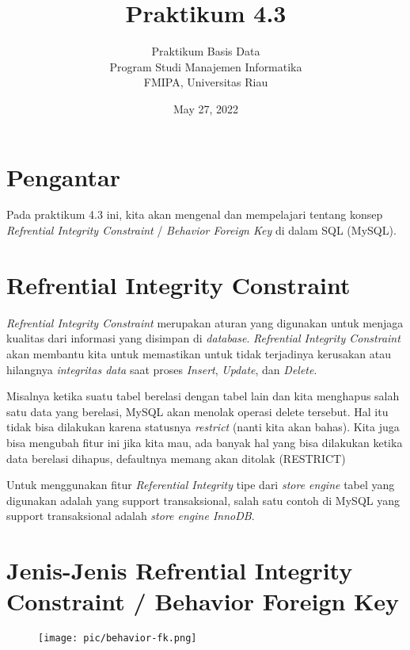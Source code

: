 \documentclass[a4paper]{article}
\title{Praktikum 4.3}
\author{Praktikum Basis Data\\ Program Studi Manajemen Informatika \\ FMIPA, Universitas Riau }
\date{May 27, 2022}
\begin{document}
\maketitle

\section{Pengantar}%
\label{sec:pengantar}

Pada praktikum 4.3 ini, kita akan mengenal dan mempelajari tentang konsep \textit{Refrential Integrity Constraint} /  \textit{Behavior Foreign Key} di dalam SQL (MySQL).

\section{Refrential Integrity Constraint}%
\label{sec:section_name}

\textit{Refrential Integrity Constraint} merupakan aturan yang digunakan untuk menjaga kualitas dari informasi yang disimpan di \textit{database}. \textit{Refrential  Integrity Constraint} akan membantu kita untuk memastikan untuk tidak terjadinya kerusakan atau hilangnya \textit{integritas data} saat proses \textit{Insert}, \textit{Update}, dan \textit{Delete}.

Misalnya ketika suatu tabel berelasi dengan tabel lain dan kita menghapus salah satu data yang berelasi, MySQL akan menolak operasi delete tersebut. Hal itu tidak bisa dilakukan karena statusnya \textit{restrict} (nanti kita akan bahas).  Kita juga bisa mengubah fitur ini jika kita mau, ada banyak hal yang bisa dilakukan ketika data berelasi dihapus, defaultnya memang akan ditolak (RESTRICT)

Untuk menggunakan fitur \textit{Referential Integrity} tipe dari \textit{store engine} tabel yang digunakan adalah yang support transaksional, salah satu contoh di MySQL yang support transaksional adalah \textit{store engine InnoDB}. 

\section{Jenis-Jenis Refrential Integrity Constraint / Behavior Foreign Key}%
\label{sec:section_name}
\begin{figure}[htpb]
	\centering
	\texttt{[image: pic/behavior-fk.png]}
\end{figure}
\end{document}
